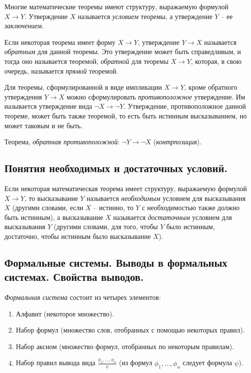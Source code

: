 \begin{definition}
    Многие математические теоремы имеют структуру, выражаемую формулой $X \rightarrow Y$. Утверждение $X$ называется \emph{условием} теоремы, а утверждение $Y$ -- ее \emph{заключением}.

    Если некоторая теорема имеет форму $X \rightarrow Y$, утверждение $Y \rightarrow X$ называется \emph{обратным} для данной теоремы. Это утверждение может быть справедливым, и тогда оно называется теоремой, \emph{обратной} для теоремы $X \rightarrow Y$, которая, в свою очередь, называется \emph{прямой} теоремой.

    Для теоремы, сформулированной в виде импликации $X \rightarrow Y$, кроме обратного утверждения $Y \rightarrow X$ можно сформулировать \emph{противоположное} утверждение. Им называется утверждение вида $\lnot X \rightarrow \lnot Y$. Утверждение, противоположное данной теореме, может быть также теоремой, то есть быть истинным высказыванием, но может таковым и не быть.

    Теорема, \emph{обратная противоположной}: $\lnot Y \rightarrow \lnot X$ (\emph{контрпозиция}).
\end{definition}

\subsection{Понятия необходимых и достаточных условий.}

\begin{definition}
    Если некоторая математическая теорема имеет структуру, выражаемую формулой $X \rightarrow Y$, то высказывание $Y$ называется \emph{необходимым} условием для высказывания $X$ (другими словами, если $X$ -- истинно, то $Y$ с необходимостью также должно быть истинным), а высказывание $X$ называется \emph{достаточным} условием для высказывания $Y$ (другими словами, для того, чтобы $Y$ было истинным, достаточно, чтобы истинным было высказывание $X$).
\end{definition}

\subsection{Формальные системы. Выводы в формальных системах. Свойства выводов.}

\begin{definition}
    \emph{Формальная система} состоит из четырех элементов:
    \begin{enumerate}
        \item Алфавит (некоторое множество).
        \item Набор формул (множество слов, отобранных с помощью некоторых правил).
        \item Набор аксиом (множество формул, отобранных по некоторым правилам).
        \item Набор правил вывода вида $\frac{\phi_1,\ldots,\phi_n}{\psi}$ (из формул $\phi_1,\ldots,\phi_n$ следует формула $\psi$).
    \end{enumerate}
\end{definition}


